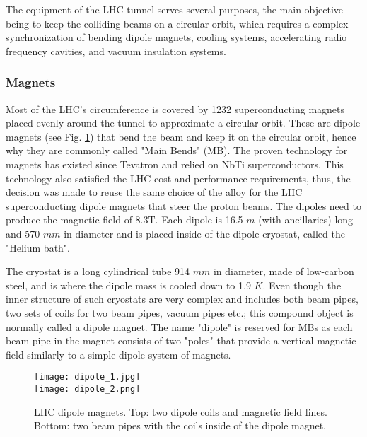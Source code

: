 \begin{normalsize}
The equipment of the LHC tunnel serves several purposes,  the main objective being to keep the colliding beams on a circular orbit, which requires a complex synchronization of bending dipole magnets, cooling systems, accelerating radio frequency cavities, and vacuum insulation systems.



\subsubsection{Magnets}\label{sec:magnets}

Most of the LHC's circumference is covered by 1232 superconducting magnets placed evenly around the tunnel to approximate a circular orbit. These are dipole magnets (see Fig. \ref{dipoles_coils}) that bend the beam and keep it on the circular orbit, hence why they are commonly called "Main Bends" (MB). The proven technology for magnets has existed since Tevatron and relied on NbTi superconductors. This technology also satisfied the LHC cost and performance requirements, thus, the decision was made to reuse the same choice of the alloy for the LHC superconducting dipole magnets that steer the proton beams. The dipoles need to produce the magnetic field of 8.3T. %
Each dipole is 16.5 $m$ (with ancillaries) long and 570 $mm$ in diameter and is placed inside of the dipole cryostat, called the "Helium bath". 

The cryostat is a long cylindrical tube 914 $mm$ in diameter, made of low-carbon steel, and is where the dipole mass is cooled down to 1.9 $K$. Even though the inner structure of such cryostats are very complex and includes both beam pipes, two sets of coils for two beam pipes, vacuum pipes etc.; this compound object is normally called a dipole magnet. The name "dipole" is reserved for MBs as each beam pipe in the magnet consists of two "poles" that provide a vertical magnetic field similarly to a simple dipole system of magnets. 


\begin{figure}[H]
\centering
\texttt{[image: dipole\_1.jpg]}\\
\vspace{0.5cm}
\texttt{[image: dipole\_2.png]}
\caption[LHC dipoles]{LHC dipole magnets. Top: two dipole coils and magnetic field lines. Bottom: two beam pipes with the coils inside of the dipole magnet. }
\label{dipoles_coils}
\end{figure}




\end{normalsize}
